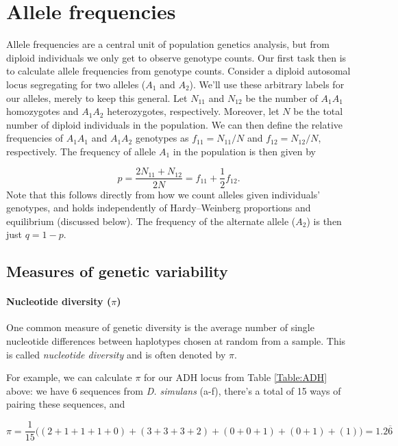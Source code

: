 \section{Allele frequencies}
Allele frequencies are a central unit of population genetics
analysis, but from diploid individuals we only get to observe genotype
counts. Our first task then is to calculate allele frequencies from
genotype counts. Consider a diploid autosomal locus segregating for two alleles ($A_1$ and
$A_2$). We'll use these arbitrary labels for our alleles, merely to keep this
general. Let $N_{11}$ and $N_{12}$ be the number of $A_1A_1$ homozygotes and
$A_1A_2$ heterozygotes, respectively. Moreover, let $N$ be the total number of
diploid individuals in the population. We can then define the relative
frequencies of $A_1A_1$ and $A_1A_2$ genotypes as $f_{11} = N_{11}/N$ and
$f_{12} = N_{12}/N$, respectively. The frequency of allele $A_1$ in the
population is then given by

\begin{equation}
  p = \frac{2 N_{11} + N_{12}}{2N} = f_{11} + \frac{1}{2} f_{12}.
\end{equation}
Note that this follows directly from how we count alleles given individuals'
genotypes, and holds independently of Hardy--Weinberg proportions and
equilibrium (discussed below). The frequency of the alternate allele ($A_2$) is
then just $q=1-p$.

\subsection{Measures of genetic variability}

\paragraph{Nucleotide diversity ($\pi$)}

One common measure of genetic diversity is the average number of single
nucleotide differences between haplotypes chosen at random from a sample. This
is called \emph{nucleotide diversity} and is often denoted by $\pi$.

For example, we can calculate $\pi$ for our ADH locus from Table
\ref{Table:ADH} above: we have 6 sequences from \textit{D. simulans}  (a-f),
there's a total of 15 ways of pairing these sequences, and

\begin{equation}
\pi=\frac{1}{15} \big( (2 + 1 + 1 + 1 + 0 ) + (3 + 3 + 3 + 2 ) +(0 + 0 + 1) + (0 + 1) + (1)  \big)=1.2\overline{6}
\end{equation}

